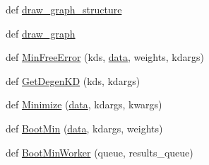 \begin{DoxyCompactItemize}
def \hyperlink{namespace_uni_dec_1_1unidec__modules_1_1_uni_fit_a96de340b3e4a0dae035372f73fd9b2da}{draw\+\_\+graph\+\_\+structure}
\item 
def \hyperlink{namespace_uni_dec_1_1unidec__modules_1_1_uni_fit_a51ebf5177748a886005dd0f800951919}{draw\+\_\+graph}
\item 
def \hyperlink{namespace_uni_dec_1_1unidec__modules_1_1_uni_fit_a8747bda6a52229ab1e7172368d3d286f}{Min\+Free\+Error} (kds, \hyperlink{namespace_uni_dec_1_1unidec__modules_1_1_uni_fit_abe318bc901f95348802963e243c953c1}{data}, weights, kdargs)
\item 
def \hyperlink{namespace_uni_dec_1_1unidec__modules_1_1_uni_fit_ac18908ccc855bdf98e93ff79422b36fe}{Get\+Degen\+K\+D} (kds, kdargs)
\item 
def \hyperlink{namespace_uni_dec_1_1unidec__modules_1_1_uni_fit_a20d2c96a6a3ce74770c41fa49ca270bf}{Minimize} (\hyperlink{namespace_uni_dec_1_1unidec__modules_1_1_uni_fit_abe318bc901f95348802963e243c953c1}{data}, kdargs, kwargs)
\item 
def \hyperlink{namespace_uni_dec_1_1unidec__modules_1_1_uni_fit_a7f5dfc20dc5f0e03356e189298a83584}{Boot\+Min} (\hyperlink{namespace_uni_dec_1_1unidec__modules_1_1_uni_fit_abe318bc901f95348802963e243c953c1}{data}, kdargs, weights)
\item 
def \hyperlink{namespace_uni_dec_1_1unidec__modules_1_1_uni_fit_a0a803eb205609cc27b027d37135d8b31}{Boot\+Min\+Worker} (queue, results\+\_\+queue)
\end{DoxyCompactItemize}
